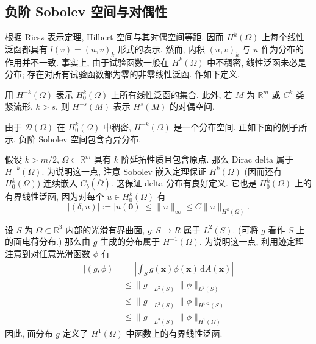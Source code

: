 \subsection{负阶 Sobolev 空间与对偶性}\label{sec:negative-sobolev-duality}

根据 Riesz 表示定理, Hilbert 空间与其对偶空间等距. 因而 $H^k(\Omega)$ 上每个线性泛函都具有 $l(v)=(u,v)_k$ 形式的表示. 然而, 内积 $(u,v)_k$ 与 $u$ 作为分布的作用并不一致. 事实上, 由于试验函数一般在 $H^k(\Omega)$ 中不稠密, 线性泛函未必是分布; 存在对所有试验函数都为零的非零线性泛函. 作如下定义.

\begin{Definition}
\label{def:negative-order-sobolev-dual-spaces}
用 $H^{-k}(\Omega)$ 表示 $H_0^k(\Omega)$ 上所有线性泛函的集合. 此外, 若 $M$ 为 $\mathbb{R}^m$ 或 $C^k$ 类紧流形, $k>s$, 则 $H^{-s}(M)$ 表示 $H^s(M)$ 的对偶空间.
\end{Definition}

由于 $\mathcal{D}(\Omega)$ 在 $H_0^k(\Omega)$ 中稠密, $H^{-k}(\Omega)$ 是一个分布空间. 正如下面的例子所示, 负阶 Sobolev 空间包含奇异分布.

\begin{Example}
\label{ex:dirac-negative-sobolev-membership}
假设 $k>m/2$, $\Omega\subset\mathbb{R}^m$ 具有 $k$ 阶延拓性质且包含原点. 那么 Dirac delta 属于 $H^{-k}(\Omega)$. 为说明这一点, 注意 Sobolev 嵌入定理保证 $H^k(\Omega)$ (因而还有 $H_0^k(\Omega)$) 连续嵌入 $C_b(\overline\Omega)$. 这保证 delta 分布有良好定义. 它也是 $H_0^k(\Omega)$ 上的有界线性泛函, 因为对每个 $u\in H_0^k(\Omega)$ 有\[|(\delta,u)|:=|u(\bm{0})|\leq\|u\|_{\infty}\leq C\|u\|_{H^k(\Omega)}.\]
\end{Example}

\begin{Example}
\label{ex:surface-charge-negative-sobolev}
设 $S$ 为 $\Omega\subset\mathbb{R}^3$ 内部的光滑有界曲面, $g:S\to R$ 属于 $L^2(S)$. (可将 $g$ 看作 $S$ 上的面电荷分布.) 那么由 $g$ 生成的分布属于 $H^{-1}(\Omega)$. 为说明这一点, 利用迹定理注意到对任意光滑函数 $\phi$ 有\[\begin{aligned}
|(g,\phi)|&=\left|\int_Sg(\bm{x})\phi(\bm{x})\,\mathrm{d}A(\bm{x})\right|\\
&\leq\|g\|_{L^2(S)}\|\phi\|_{L^2(S)}\\
&\leq\|g\|_{L^2(S)}\|\phi\|_{H^{1/2}(S)}\\
&\leq\|g\|_{L^2(S)}\|\phi\|_{H^1(\Omega)}
\end{aligned}\]因此, 面分布 $g$ 定义了 $H^1(\Omega)$ 中函数上的有界线性泛函.
\end{Example}

